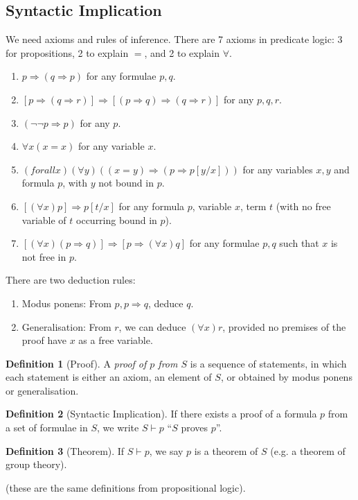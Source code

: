 \documentclass{article}
\theoremstyle{definition}
\newtheorem{definition}{Definition}
\numberwithin{definition}{section}
\newcommand{\proves}{\vdash}
\begin{document}
\subsection{Syntactic Implication}
We need axioms and rules of inference. There are 7 axioms in predicate logic: 3 for propositions, 2 to explain $=$, and 2 to explain $\forall$. 
\begin{enumerate}
\item $p \Rightarrow (q \Rightarrow p)$ for any formulae $p,q$. 
\item $[p \Rightarrow (q \Rightarrow r)] \Rightarrow [(p \Rightarrow q) \Rightarrow (q \Rightarrow r)]$ for any $p,q,r$.
\item $(\neg \neg p \Rightarrow p)$ for any $p$.
\item $\forall x (x=x)$ for any variable $x$. 
\item $(forall x) (\forall y) ((x=y) \Rightarrow (p \Rightarrow p[y/x]))$ for any variables $x,y$ and formula $p$, with $y$ not bound in $p$. 
\item $[(\forall x) p] \Rightarrow p[t/x]$ for any formula $p$, variable $x$, term $t$ (with no free variable of $t$ occurring bound in $p$). 
\item $[(\forall x) (p \Rightarrow q)] \Rightarrow [p \Rightarrow (\forall x)q]$ for any formulae $p,q$ such that $x$ is not free in $p$. 
\end{enumerate}
There are two deduction rules: 
\begin{enumerate}
\item Modus ponens: From $p,p \Rightarrow q$, deduce $q$.
\item Generalisation: From $r$, we can deduce $(\forall x) r$, provided no premises of the proof have $x$ as a free variable.
\end{enumerate}

\begin{definition}[Proof]
A \textit{proof of $p$ from $S$} is a sequence of statements, in which each statement is either an axiom, an element of $S$, or obtained by modus ponens or generalisation. 
\end{definition}

\begin{definition}[Syntactic Implication]
If there exists a proof of a formula $p$ from a set of formulae in $S$, we write $S \proves p$ ``$S$ proves $p$''. 
\end{definition}

\begin{definition}[Theorem]
If $S \proves p$, we say $p$ is a theorem of $S$ (e.g. a theorem of group theory). 
\end{definition}
(these are the same definitions from propositional logic). 
\end{document}
